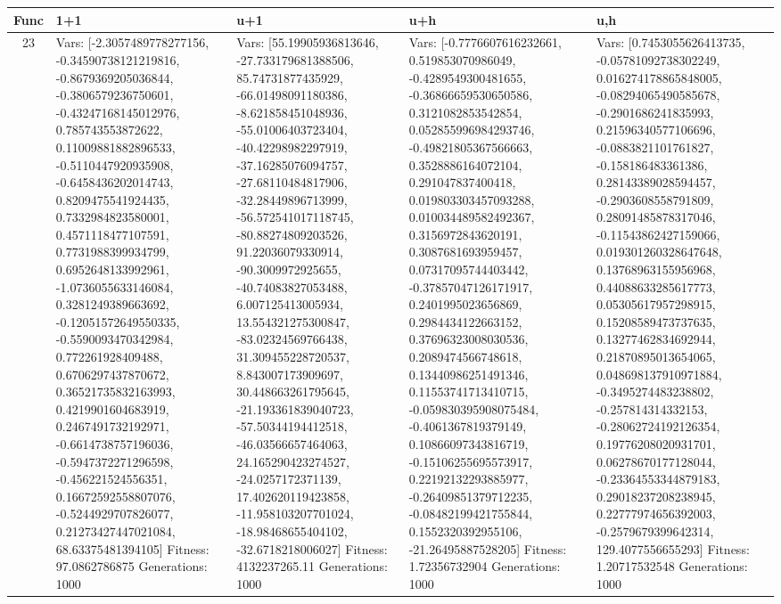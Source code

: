 \documentclass[landscape,11pt]{article}
\begin{document}
\begin{tabular}{|c|p{5.4cm}|p{5.4cm}|p{5.4cm}|p{5.4cm}|}
\hline
Func & 1+1 & u+1 & u+h & u,h \\ 
\hline 23 & Vars: [-2.3057489778277156, -0.34590738121219816, -0.8679369205036844, -0.3806579236750601, -0.43247168145012976, 0.785743553872622, 0.11009881882896533, -0.5110447920935908, -0.6458436202014743, 0.8209475541924435, 0.7332984823580001, 0.4571118477107591, 0.7731988399934799, 0.6952648133992961, -1.0736055633146084, 0.3281249389663692, -0.12051572649550335, -0.5590093470342984, 0.772261928409488, 0.6706297437870672, 0.36521735832163993, 0.4219901604683919, 0.2467491732192971, -0.6614738757196036, -0.5947372271296598, -0.456221524556351, 0.16672592558807076, -0.5244929707826077, 0.21273427447021084, 68.63375481394105] Fitness: 97.0862786875 Generations: 1000 & Vars: [55.19905936813646, -27.733179681388506, 85.74731877435929, -66.01498091180386, -8.621858451048936, -55.01006403723404, -40.42298982297919, -37.16285076094757, -27.68110484817906, -32.28449896713999, -56.572541017118745, -80.88274809203526, 91.22036079330914, -90.3009972925655, -40.74083827053488, 6.007125413005934, 13.554321275300847, -83.02324569766438, 31.309455228720537, 8.843007173909697, 30.448663261795645, -21.193361839040723, -57.50344194412518, -46.03566657464063, 24.165290423274527, -24.0257172371139, 17.402620119423858, -11.958103207701024, -18.98468655404102, -32.6718218006027] Fitness: 4132237265.11 Generations: 1000 & Vars: [-0.7776607616232661, 0.519853070986049, -0.4289549300481655, -0.36866659530650586, 0.3121082853542854, 0.052855996984293746, -0.49821805367566663, 0.3528886164072104, 0.291047837400418, 0.019803303457093288, 0.010034489582492367, 0.3156972843620191, 0.3087681693959457, 0.07317095744403442, -0.37857047126171917, 0.2401995023656869, 0.2984434122663152, 0.37696323008030536, 0.2089474566748618, 0.13440986251491346, 0.11553741713410715, -0.059830395908075484, -0.4061367819379149, 0.10866097343816719, -0.15106255695573917, 0.22192132293885977, -0.26409851379712235, -0.08482199421755844, 0.1552320392955106, -21.26495887528205] Fitness: 1.72356732904 Generations: 1000 & Vars: [0.7453055626413735, -0.05781092738302249, 0.016274178865848005, -0.08294065490585678, -0.2901686241835993, 0.21596340577106696, -0.0883821101761827, -0.158186483361386, 0.28143389028594457, -0.2903608558791809, 0.28091485878317046, -0.11543862427159066, 0.019301260328647648, 0.13768963155956968, 0.44088633285617773, 0.05305617957298915, 0.15208589473737635, 0.13277462834692944, 0.21870895013654065, 0.048698137910971884, -0.3495274483238802, -0.257814314332153, -0.28062724192126354, 0.19776208020931701, 0.06278670177128044, -0.23364553344879183, 0.29018237208238945, 0.22777974656392003, -0.2579679399642314, 129.4077556655293] Fitness: 1.20717532548 Generations: 1000 \\
 \hline 
\end{tabular}
\end{document}
